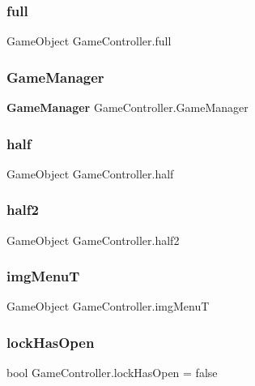 \mbox{\label{class_game_controller_a12444e99db83409eba81c3f0a4e4f72d}} 
\subsubsection{full}
{\footnotesize\ttfamily Game\+Object Game\+Controller.\+full}

\mbox{\label{class_game_controller_a0d2693bb7a093d5a895decc27a574bc5}} 
\subsubsection{GameManager}
{\footnotesize\ttfamily \textbf{ Game\+Manager} Game\+Controller.\+Game\+Manager}

\mbox{\label{class_game_controller_ae8416e47072a621345855824f57dbcb6}} 
\subsubsection{half}
{\footnotesize\ttfamily Game\+Object Game\+Controller.\+half}

\mbox{\label{class_game_controller_add6031b79c36a7a019a1c363b0677ec8}} 
\subsubsection{half2}
{\footnotesize\ttfamily Game\+Object Game\+Controller.\+half2}

\mbox{\label{class_game_controller_a9bc53f58881f381b46a16fb372eb1119}} 
\subsubsection{imgMenuT}
{\footnotesize\ttfamily Game\+Object Game\+Controller.\+img\+MenuT}

\mbox{\label{class_game_controller_a202002c8d1c529e54f966e4d93bffc91}} 
\subsubsection{lockHasOpen}
{\footnotesize\ttfamily bool Game\+Controller.\+lock\+Has\+Open = false}

